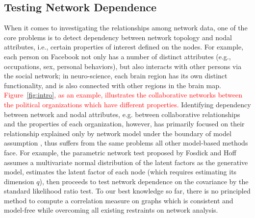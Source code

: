 \documentclass[11pt]{article}
\theoremstyle{definition}
\begin{document}
\subsection{Testing Network Dependence}
When it comes to investigating the relationships among network data, one of the core problems is to detect dependency between network topology and nodal attributes, i.e., certain properties of interest defined on the nodes. For example, each person on Facebook not only has a number of distinct attributes (e.g., occupations, sex, personal behaviors), but also interacts with other persons via the social network; in neuro-science, each brain region has its own distinct functionality, and is also connected with other regions in the brain map. \textcolor{red}{Figure~\ref{fig:intro}, as an example, illustrates the collaborative networks between the political organizations which have different properties.} Identifying dependency between network and nodal attributes, e.g. between collaborative relationships and the properties of each organization, however, has primarily focused on their relationship explained only by network model under the boundary of model assumption \cite{wasserman1996logit, fosdick2015testing, howard2016understanding}, thus suffers from the same problems all other model-based methods face. For example, the parametric network test proposed by Fosdick and Hoff \cite{fosdick2015testing} assumes a multivariate normal distribution of the latent factors as the generative model, estimates the latent factor of each node (which requires estimating its dimension $q$), then proceeds to test network dependence on the covariance by the standard likelihood ratio test. To our best knowledge so far, there is no principled method to compute a correlation measure on graphs which is consistent and model-free while overcoming all existing restraints on network analysis. 
\end{document}
